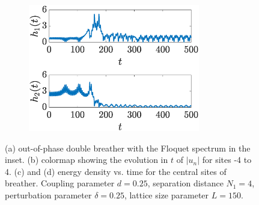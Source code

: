\documentclass[12pt,reqno]{amsart}
\theoremstyle{definition}
\begin{document}
\begin{figure}
\begin{center}
\begin{subfigure}{0.45\linewidth}
		\includegraphics[width=7.5cm]{N4pmh2.eps}
		\label{fig:timestepSGpmlongd}
	\end{subfigure}
	\end{center}
	\caption{(a) out-of-phase double breather with the Floquet spectrum in  the inset. (b) colormap showing the evolution in $t$ of $|u_n|$ for sites -4 to 4. (c) and (d) energy density vs. time for the central sites of breather. Coupling parameter $d=0.25$, separation distance $N_1 = 4$, perturbation parameter $\delta = 0.25$, lattice size parameter $L=150$.}
	\label{fig:timestepSGpmlong}
\end{figure}
\end{document}
